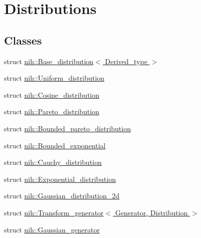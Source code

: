 \hypertarget{group__distributions}{
\section{\-Distributions}
\label{group__distributions}
}
\subsection*{\-Classes}
\begin{DoxyCompactItemize}
\item 
struct \hyperlink{structnih_1_1_base__distribution}{nih\-::\-Base\-\_\-distribution$<$ Derived\-\_\-type $>$}
\item 
struct \hyperlink{structnih_1_1_uniform__distribution}{nih\-::\-Uniform\-\_\-distribution}
\item 
struct \hyperlink{structnih_1_1_cosine__distribution}{nih\-::\-Cosine\-\_\-distribution}
\item 
struct \hyperlink{structnih_1_1_pareto__distribution}{nih\-::\-Pareto\-\_\-distribution}
\item 
struct \hyperlink{structnih_1_1_bounded__pareto__distribution}{nih\-::\-Bounded\-\_\-pareto\-\_\-distribution}
\item 
struct \hyperlink{structnih_1_1_bounded__exponential}{nih\-::\-Bounded\-\_\-exponential}
\item 
struct \hyperlink{structnih_1_1_cauchy__distribution}{nih\-::\-Cauchy\-\_\-distribution}
\item 
struct \hyperlink{structnih_1_1_exponential__distribution}{nih\-::\-Exponential\-\_\-distribution}
\item 
struct \hyperlink{structnih_1_1_gaussian__distribution__2d}{nih\-::\-Gaussian\-\_\-distribution\-\_\-2d}
\item 
struct \hyperlink{structnih_1_1_transform__generator}{nih\-::\-Transform\-\_\-generator$<$ Generator, Distribution $>$}
\item 
struct \hyperlink{structnih_1_1_gaussian__generator}{nih\-::\-Gaussian\-\_\-generator}
\end{DoxyCompactItemize}
